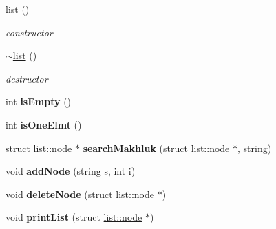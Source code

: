\begin{DoxyCompactItemize}
\item 
\hyperlink{classlist_a223ecca7c96ef287c1e647493a32fbf6}{list} ()
\begin{DoxyCompactList}\small\item\em constructor \end{DoxyCompactList}\item 
\hyperlink{classlist_a72eaabb03a048506432f8d167db12524}{$\sim$list} ()\hypertarget{classlist_a72eaabb03a048506432f8d167db12524}{}\label{classlist_a72eaabb03a048506432f8d167db12524}

\begin{DoxyCompactList}\small\item\em destructor \end{DoxyCompactList}\item 
int {\bfseries is\+Empty} ()\hypertarget{classlist_a890b680743d30859bf0b5dbbdc3d8544}{}\label{classlist_a890b680743d30859bf0b5dbbdc3d8544}

\item 
int {\bfseries is\+One\+Elmt} ()\hypertarget{classlist_a4c10a6850cbbffa7c652868e973e0625}{}\label{classlist_a4c10a6850cbbffa7c652868e973e0625}

\item 
struct \hyperlink{structlist_1_1node}{list\+::node} $\ast$ {\bfseries search\+Makhluk} (struct \hyperlink{structlist_1_1node}{list\+::node} $\ast$, string)\hypertarget{classlist_ab629e99e39c4430c65806a3ec1dc6bb6}{}\label{classlist_ab629e99e39c4430c65806a3ec1dc6bb6}

\item 
void {\bfseries add\+Node} (string s, int i)\hypertarget{classlist_ad933a0b859de2f967649c2be0214b3fc}{}\label{classlist_ad933a0b859de2f967649c2be0214b3fc}

\item 
void {\bfseries delete\+Node} (struct \hyperlink{structlist_1_1node}{list\+::node} $\ast$)\hypertarget{classlist_ac1993ef62ac339a9d7e60baaf96b5062}{}\label{classlist_ac1993ef62ac339a9d7e60baaf96b5062}

\item 
void {\bfseries print\+List} (struct \hyperlink{structlist_1_1node}{list\+::node} $\ast$)\hypertarget{classlist_aa4cd401b862217d241c396311fc9a45e}{}\label{classlist_aa4cd401b862217d241c396311fc9a45e}

\end{DoxyCompactItemize}
